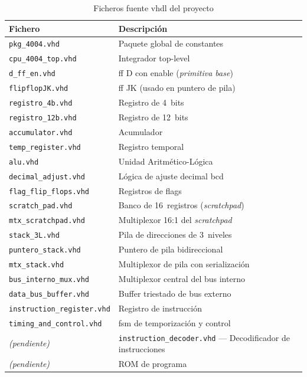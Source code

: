 \documentclass[%
    school=etsisi,%
    type=pfg,%
    degree=61CI,%
]{upm-report}
\begin{document}
\begin{table}[H]
\centering
\caption{Ficheros fuente \acrshort{vhdl} del proyecto}
\label{tab:ficheros}
\begin{tabularx}{\textwidth}{@{}lX@{}}
\toprule
\textbf{Fichero} & \textbf{Descripción} \\
\midrule
\texttt{pkg\_4004.vhd}          & Paquete global de constantes \\
\texttt{cpu\_4004\_top.vhd}     & Integrador top-level \\
\texttt{d\_ff\_en.vhd}          & \acrshort{ff} D con enable (\textit{primitiva base}) \\
\texttt{flipflopJK.vhd}         & \acrshort{ff} JK (usado en puntero de pila) \\
\texttt{registro\_4b.vhd}       & Registro de 4~bits \\
\texttt{registro\_12b.vhd}      & Registro de 12~bits \\
\texttt{accumulator.vhd}        & Acumulador \\
\texttt{temp\_register.vhd}     & Registro temporal \\
\texttt{alu.vhd}                & Unidad Aritmético-Lógica \\
\texttt{decimal\_adjust.vhd}    & Lógica de ajuste decimal \acrshort{bcd} \\
\texttt{flag\_flip\_flops.vhd}  & Registros de flags \\
\texttt{scratch\_pad.vhd}       & Banco de 16~registros (\textit{scratchpad}) \\
\texttt{mtx\_scratchpad.vhd}    & Multiplexor 16:1 del \textit{scratchpad} \\
\texttt{stack\_3L.vhd}          & Pila de direcciones de 3~niveles \\
\texttt{puntero\_stack.vhd}     & Puntero de pila bidireccional \\
\texttt{mtx\_stack.vhd}         & Multiplexor de pila con serialización \\
\texttt{bus\_interno\_mux.vhd}  & Multiplexor central del bus interno \\
\texttt{data\_bus\_buffer.vhd}  & Buffer triestado de bus externo \\
\texttt{instruction\_register.vhd} & Registro de instrucción \\
\texttt{timing\_and\_control.vhd}  & \acrshort{fsm} de temporización y control \\
\midrule
\textit{(pendiente)} & \texttt{instruction\_decoder.vhd} --- Decodificador de instrucciones \\
\textit{(pendiente)} & ROM de programa \\
\bottomrule
\end{tabularx}
\end{table}
\end{document}
